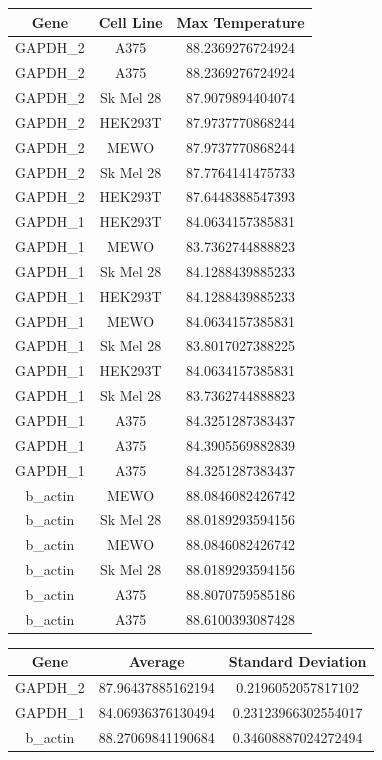 \documentclass{article}
\begin{document}
\begin{tabular}{|c|c|c|}
    \hline
    Gene & Cell Line & Max Temperature \\
    \hline
    GAPDH\_2 & A375 & 88.2369276724924 \\
    \hline
    GAPDH\_2 & A375 & 88.2369276724924 \\
    \hline
    GAPDH\_2 & Sk Mel 28 & 87.9079894404074 \\
    \hline
    GAPDH\_2 & HEK293T & 87.9737770868244 \\
    \hline
    GAPDH\_2 & MEWO & 87.9737770868244 \\
    \hline
    GAPDH\_2 & Sk Mel 28 & 87.7764141475733 \\
    \hline
    GAPDH\_2 & HEK293T & 87.6448388547393 \\
    \hline
    GAPDH\_1 & HEK293T & 84.0634157385831 \\
    \hline
    GAPDH\_1 & MEWO & 83.7362744888823 \\
    \hline
    GAPDH\_1 & Sk Mel 28 & 84.1288439885233 \\
    \hline
    GAPDH\_1 & HEK293T & 84.1288439885233 \\
    \hline
    GAPDH\_1 & MEWO & 84.0634157385831 \\
    \hline
    GAPDH\_1 & Sk Mel 28 & 83.8017027388225 \\
    \hline
    GAPDH\_1 & HEK293T & 84.0634157385831 \\
    \hline
    GAPDH\_1 & Sk Mel 28 & 83.7362744888823 \\
    \hline
    GAPDH\_1 & A375 & 84.3251287383437 \\
    \hline
    GAPDH\_1 & A375 & 84.3905569882839 \\
    \hline
    GAPDH\_1 & A375 & 84.3251287383437 \\
    \hline
    b\_actin & MEWO & 88.0846082426742 \\
    \hline
    b\_actin & Sk Mel 28 & 88.0189293594156 \\
    \hline
    b\_actin & MEWO & 88.0846082426742 \\
    \hline
    b\_actin & Sk Mel 28 & 88.0189293594156 \\
    \hline
    b\_actin & A375 & 88.8070759585186 \\
    \hline
    b\_actin & A375 & 88.6100393087428 \\
    \hline
    \end{tabular}


    \begin{tabular}{|c|c|c|}
        \hline
        Gene & Average & Standard Deviation \\
        \hline
        GAPDH\_2 & 87.96437885162194 & 0.2196052057817102 \\
        \hline
        GAPDH\_1 & 84.06936376130494 & 0.23123966302554017 \\
        \hline
        b\_actin & 88.27069841190684 & 0.34608887024272494 \\
        \hline
        \end{tabular}
\end{document}
